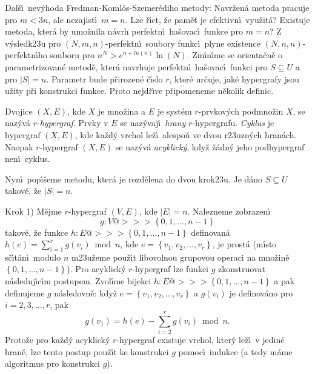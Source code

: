 \flushpar Dal\v s\'\i\ nev\'yhoda Fredman-Koml\'os-Szemer\'ediho metody:\newline 
Navr\v zen\'a metoda pracuje pro $m<3n$, ale nezajist\'\i\ $m=n$. 
Lze \v r\'\i ct, \v ze pam\v e\v t je efektivn\'\i\ vyu\v zit\'a? Existuje 
metoda, kter\'a by umo\v znila n\'avrh perfektn\'\i\ ha\v sovac\'\i\ 
funkce pro $m=n$? Z v\'ysledk\accent23u pro 
$\left(N,m,n\right)$-perfektn\'\i\ soubory funkc\'\i\ plyne existence 
$\left(N,n,n\right)$-perfektn\'\i ho souboru pro $n^N>e^{n+ln\left(n\right)}\ln\left(N\right)$. 
Zm\'\i n\'\i me se orienta\v cn\v e o parametrizovan\'e metod\v e, kter\'a 
navr\-huje perfektn\'\i\ ha\v sovac\'\i\ funkci pro $S\subseteq U$ a pro 
$|S|=n$. Parametr bude p\v rirozen\'e \v c\'\i slo $r$, kter\'e ur\v cuje, 
jak\'e hypergrafy jsou u\v zity p\v ri konstrukci funkce. Proto 
nejd\v r\'\i ve p\v ripomeneme n\v ekolik definic.

\flushpar Dvojice $\left(X,E\right)$, kde $X$ je mno\v zina a $E$ je syst\'em 
$r$-prvkov\'ych podmno\v zin $X$, se naz\'yv\'a $r$-\emph{hypergraf}.  
Prvky v $E$ se naz\'yvaj\'\i\ \emph{hrany} $r$-hypergrafu.  
\emph{Cyklus} je hypergraf $\left(X,E\right)$, kde ka\v zd\'y vrchol le\v z\'\i\ 
alespo\v n ve dvou r\accent23uzn\'ych hran\'ach.  Naopak 
$r$-hypergraf $\left(X,E\right)$ se naz\'yv\'a \emph{acyklick\'y}, kdy\v z 
\v z\'adn\'y jeho podhypergraf nen\'\i\ cyklus.  
\medskip

\flushpar Nyn\'\i\ pop\'\i\v seme metodu, kter\'a je rozd\v elena do 
dvou krok\accent23u. Je d\'ano $S\subseteq U$ takov\'e, \v ze 
$|S|=n$.
\medskip

\flushpar Krok 1) M\v ejme $r$-hypergraf $\left(V,E\right)$, kde $|E|=n$.  Nalezneme 
zobrazen\'\i\ $$g:V@>>>\left\{0,1,\dots,n-1\right\}$$ 
takov\'e, \v ze funkce 
$h:E@>>>\left\{0,1,\dots,n-1\right\}$ definovan\'a $h\left(e\right)=\sum_{i=1}^rg\left(v_i\right)\bmod n$, 
kde $e=\left\{v_1,v_2,\dots,v_r\right\}$, je prost\'a (m\'\i sto s\v c\'\i t\'an\'\i\ modulo $n$ 
m\accent23u\v zeme pou\v z\'\i t libovolnou grupovou operaci na 
mno\v zin\v e $\left\{0,1,\dots,n-1\right\}$).  Pro acyklick\'y $r$-hypergraf lze 
funkci $g$ zkonstruovat n\'asle\-duj\'\i c\'\i m postupem.  Zvol\'\i me 
bijekci $h:E@>>>\left\{0,1,\dots,n-1\right\}$ a pak definujeme $g$ 
n\'asledovn\v e:  kdy\v z $e=\left\{v_1,v_2,\dots,v_r\right\}$ a $g\left(v_i\right)$ je 
definov\'ano pro $i=2,3,\dots,r$, pak 
$$g\left(v_1\right)=h\left(e\right)-\sum_{i=2}^rg\left(v_i\right)\bmod n.$$
Proto\v ze pro ka\v zd\'y acyklick\'y $r$-hypergraf existuje vrchol, kter\'y 
le\v z\'\i\ v jedin\'e hran\v e, lze tento postup pou\v z\'\i t ke konstrukci $
g$ 
pomoc\'\i\ indukce (a tedy m\'ame algoritmus pro konstrukci $g$).  
\smallskip

